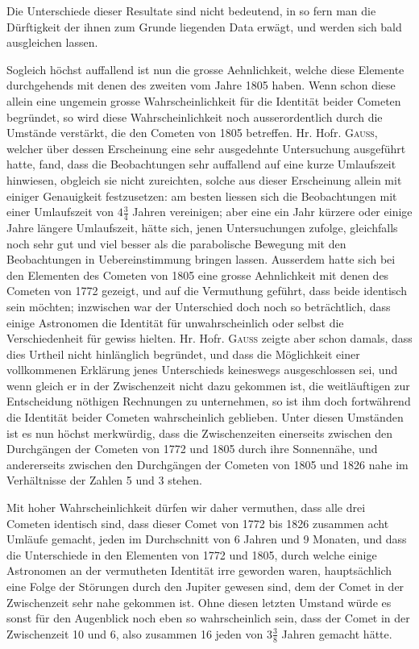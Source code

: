 Die Unterschiede dieser Resultate sind nicht bedeutend, in so fern man die
Dürftigkeit der ihnen zum Grunde liegenden Data erwägt, und werden sich bald
ausgleichen lassen.

Sogleich höchst auffallend ist nun die grosse Aehnlichkeit, welche diese
Elemente durchgehends mit denen des zweiten vom Jahre 1805 haben. Wenn schon
diese allein eine ungemein grosse Wahrscheinlichkeit für die Identität beider
Cometen begründet, so wird diese Wahrscheinlichkeit noch ausserordentlich
durch die Umstände verstärkt, die den Cometen von 1805 betreffen. Hr. Hofr.
\textsc{Gauss}, welcher über dessen Erscheinung eine sehr ausgedehnte Untersuchung
ausgeführt hatte, fand, dass die
Beobachtungen sehr auffallend auf eine kurze Umlaufszeit hinwiesen, obgleich sie nicht
zureichten, solche aus dieser Erscheinung allein mit einiger Genauigkeit festzusetzen:
am besten liessen sich die Beobachtungen mit einer Umlaufszeit von $4\frac{3}{4}$ Jahren
vereinigen; aber eine ein Jahr kürzere oder einige Jahre längere Umlaufszeit, hätte sich,
jenen Untersuchungen zufolge, gleichfalls noch sehr gut und viel besser als die
parabolische Bewegung mit den Beobachtungen in Uebereinstimmung bringen lassen.
Ausserdem hatte sich bei den Elementen des Cometen von 1805 eine grosse Aehnlichkeit
mit denen des Cometen von 1772 gezeigt, und auf die Vermuthung geführt, dass beide
identisch sein möchten; inzwischen war der Unterschied doch noch so beträchtlich, dass
einige Astronomen die Identität für unwahrscheinlich oder selbst die Verschiedenheit für
gewiss hielten. Hr. Hofr. \textsc{Gauss} zeigte aber schon damals, dass dies Urtheil nicht
hinlänglich begründet, und dass die Möglichkeit einer vollkommenen Erklärung jenes
Unterschieds keineswegs ausgeschlossen sei, und wenn gleich er in der Zwischenzeit
nicht dazu gekommen ist, die weitläuftigen zur Entscheidung nöthigen Rechnungen zu
unternehmen, so ist ihm doch fortwährend die Identität beider Cometen wahrscheinlich
geblieben. Unter diesen Umständen ist es nun höchst merkwürdig, dass die Zwischenzeiten
einerseits zwischen den Durchgängen der Cometen von 1772 und 1805 durch ihre
Sonnennähe, und andererseits zwischen den Durchgängen der Cometen von 1805 und
1826 nahe im Verhältnisse der Zahlen 5 und 3 stehen.

Mit hoher Wahrscheinlichkeit dürfen wir daher vermuthen, dass alle drei Cometen
identisch sind, dass dieser Comet von 1772 bis 1826 zusammen acht Umläufe gemacht,
jeden im Durchschnitt von 6 Jahren und 9 Monaten, und dass die Unterschiede in den
Elementen von 1772 und 1805, durch welche einige Astronomen an der vermutheten
Identität irre geworden waren, hauptsächlich eine Folge der Störungen durch den
Jupiter gewesen sind, dem der Comet in der Zwischenzeit sehr nahe gekommen ist. Ohne
diesen letzten Umstand würde es sonst für den Augenblick noch eben so wahrscheinlich
sein, dass der Comet in der Zwischenzeit 10 und 6, also zusammen 16 jeden von
$3\frac{3}{8}$ Jahren gemacht hätte.

